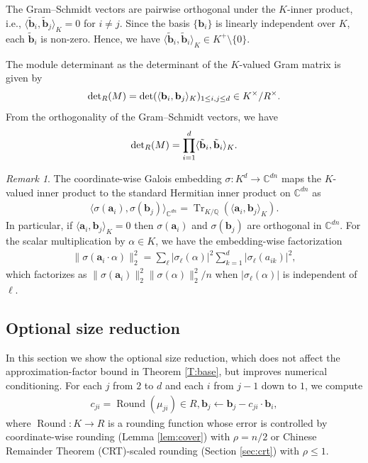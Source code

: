 \documentclass[11pt,a4paper]{article}
\theoremstyle{plain}
\theoremstyle{definition}
\theoremstyle{remark}
\newtheorem{remark}[theorem]{Remark}
\DeclareMathOperator{\Tr}{Tr}
\DeclareMathOperator{\Round}{Round}
\newcommand{\Q}{\mathbb{Q}}
\newcommand{\C}{\mathbb{C}}
\begin{document}
The Gram–Schmidt vectors are pairwise orthogonal under the $K$-inner product, i.e., $\langle \tilde{\mathbf{b}}_i, \tilde{\mathbf{b}}_j \rangle_K=0$ for $i \neq j$. Since the basis $\{\mathbf{b}_i\}$ is linearly independent over $K$, each $\tilde{\mathbf{b}}_i$ is non-zero. Hence, we have $\langle \tilde{\mathbf{b}}_i, \tilde{\mathbf{b}}_i \rangle_K \in K^+ \setminus \{0\}$.

The module determinant as the determinant of the $K$-valued Gram matrix is given by 
\begin{align}
{\rm det}_R(M)=\det(\langle \mathbf{b}_i, \mathbf{b}_j \rangle_K)_{1\le i, j\le d} \in K^\times /R^\times.
\label{E:detR}
\end{align}
From the orthogonality of the Gram–Schmidt vectors, we have
\begin{align}
  {\rm det}_R(M)=\prod_{i=1}^d \langle \tilde{\mathbf{b}}_i, \tilde{\mathbf{b}}_i \rangle_K.
  \label{E:detprod}
\end{align}

\begin{remark}\label{rem:GSembed}
The coordinate-wise Galois embedding $\sigma:K^d\to\C^{dn}$ maps the $K$-valued inner product to the standard Hermitian inner product on $\C^{dn}$ as 
  \begin{align}    
  \langle\sigma(\mathbf{a}_i), \sigma(\mathbf{b}_j)\rangle_{\C^{dn}}=\Tr_{K/\Q}(\langle\mathbf{a}_i,\mathbf{b}_j\rangle_K).
  \label{E:GSembed}
  \end{align}
  In particular, if $\langle\mathbf{a}_i, \mathbf{b}_j\rangle_K=0$ then $\sigma(\mathbf{a}_i)$ and $\sigma(\mathbf{b}_j)$ are orthogonal in $\C^{dn}$. For the scalar multiplication by $\alpha\in K$, we have the embedding-wise factorization
  \begin{align}    \|\sigma(\mathbf{a}_i\cdot\alpha)\|_2^2=\sum_{\ell}|\sigma_\ell(\alpha)|^2\sum_{k=1}^{d}|\sigma_\ell(a_{ik})|^2,
    \label{E:scalarnorm}
  \end{align}
  which factorizes as $\|\sigma(\mathbf{a}_i)\|_2^2 \|\sigma(\alpha)\|_2^2/n$ when $|\sigma_\ell(\alpha)|$ is independent of $\ell$.
\end{remark}

\subsection{Optional size reduction}
\label{subsec:phase1}

In this section we show the optional size reduction, which does not affect the approximation-factor bound in Theorem \ref{T:base}, but improves numerical conditioning. For each $j$ from $2$ to $d$ and each $i$ from $j-1$ down to $1$, we compute
\begin{align}
  c_{ji}=\Round(\mu_{ji})\in R, \mathbf{b}_j \gets \mathbf{b}_j-c_{ji}\cdot\mathbf{b}_i,
  \label{E:sizered}
\end{align}
where $\Round:K\to R$ is a rounding function whose error is controlled by coordinate-wise rounding (Lemma \ref{lem:cover}) with $\rho=n/2$ or Chinese Remainder Theorem (CRT)-scaled rounding (Section \ref{sec:crt}) with $\rho\le 1$. 
\end{document}
